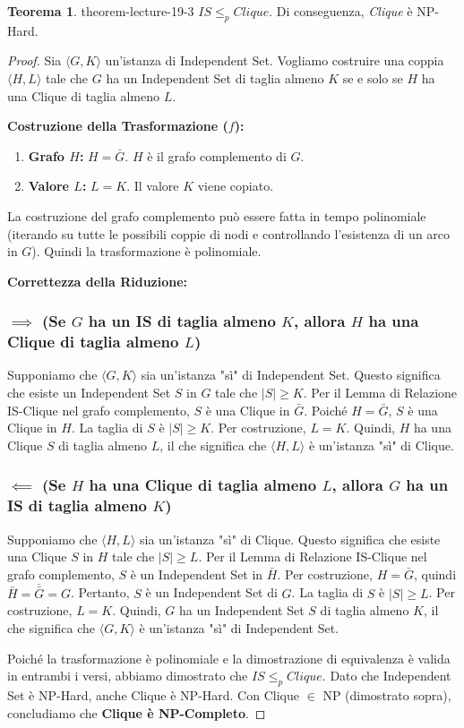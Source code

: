 \documentclass[a4paper]{article}
\theoremstyle{definition} %
\newtheorem{theorem}{Teorema}
[section]
\theoremstyle{definition} %
\begin{document}
\begin{theorem}{}{{ theorem-lecture-19-3 }}
$IS \le_p Clique$. Di conseguenza, \emph{Clique} è NP-Hard.
\end{theorem}

\begin{proof}
Sia $\langle G, K \rangle$ un'istanza di Independent Set. Vogliamo costruire una coppia $\langle H, L \rangle$ tale che $G$ ha un Independent Set di taglia almeno $K$ se e solo se $H$ ha una Clique di taglia almeno $L$.

\textbf{Costruzione della Trasformazione ($f$):}
\begin{enumerate}
    \item \textbf{Grafo $H$:} $H = \bar{G}$. $H$ è il grafo complemento di $G$.
    \item \textbf{Valore $L$:} $L = K$. Il valore $K$ viene copiato.
\end{enumerate}
La costruzione del grafo complemento può essere fatta in tempo polinomiale (iterando su tutte le possibili coppie di nodi e controllando l'esistenza di un arco in $G$). Quindi la trasformazione è polinomiale.

\textbf{Correttezza della Riduzione:}

\subsubsection{$\implies$ (Se $G$ ha un IS di taglia almeno $K$, allora $H$ ha una Clique di taglia almeno $L$)}
Supponiamo che $\langle G, K \rangle$ sia un'istanza "sì" di Independent Set. Questo significa che esiste un Independent Set $S$ in $G$ tale che $|S| \ge K$.
Per il Lemma di Relazione IS-Clique nel grafo complemento, $S$ è una Clique in $\bar{G}$.
Poiché $H=\bar{G}$, $S$ è una Clique in $H$.
La taglia di $S$ è $|S| \ge K$. Per costruzione, $L=K$.
Quindi, $H$ ha una Clique $S$ di taglia almeno $L$, il che significa che $\langle H, L \rangle$ è un'istanza "sì" di Clique.

\subsubsection{$\impliedby$ (Se $H$ ha una Clique di taglia almeno $L$, allora $G$ ha un IS di taglia almeno $K$)}
Supponiamo che $\langle H, L \rangle$ sia un'istanza "sì" di Clique. Questo significa che esiste una Clique $S$ in $H$ tale che $|S| \ge L$.
Per il Lemma di Relazione IS-Clique nel grafo complemento, $S$ è un Independent Set in $\bar{H}$.
Per costruzione, $H=\bar{G}$, quindi $\bar{H} = \overline{\bar{G}} = G$.
Pertanto, $S$ è un Independent Set di $G$.
La taglia di $S$ è $|S| \ge L$. Per costruzione, $L=K$.
Quindi, $G$ ha un Independent Set $S$ di taglia almeno $K$, il che significa che $\langle G, K \rangle$ è un'istanza "sì" di Independent Set.

Poiché la trasformazione è polinomiale e la dimostrazione di equivalenza è valida in entrambi i versi, abbiamo dimostrato che $IS \le_p Clique$. Dato che Independent Set è NP-Hard, anche Clique è NP-Hard. Con Clique $\in$ NP (dimostrato sopra), concludiamo che \textbf{Clique è NP-Completo}.
\end{proof}
\end{document}
